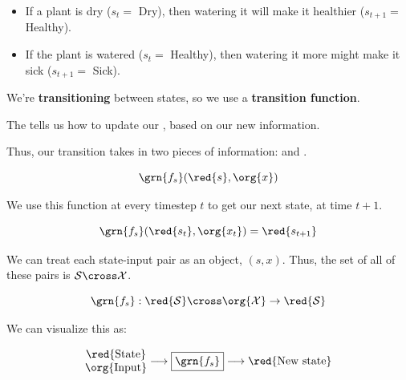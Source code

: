             \begin{itemize}
                \item If a plant is dry ($s_t=$ Dry), then watering it will make it healthier ($s_{t+1}=$ Healthy).
                \item If the plant is watered ($s_t=$ Healthy), then watering it more might make it sick ($s_{t+1}=$ Sick).
            \end{itemize}
            
            We're \textbf{transitioning} between states, so we use a \textbf{transition function}.\\
            
            \begin{definition}
                The   tells us how to update our , based on our new  information.
                
                Thus, our transition takes in two pieces of information:  and .
                
                \begin{equation*}
                    \grn{f_s}(\red{s},\org{x})
                \end{equation*}
                
                We use this function at every timestep $t$ to get our next state, at time $t+1$.
                
                \begin{equation*}
                    \grn{f_s}(\red{s_t},\org{x_t}) = \red{s_{t+1}}
                \end{equation*}
                
                We can treat each state-input pair as an object, $(s,x)$. Thus, the set of all of these pairs is $\mathcal{S} \cross \mathcal{X}$.
                
                \begin{equation*}
                    \grn{f_s}: \red{\mathcal{S}} \cross \org{\mathcal{X}} 
                    \rightarrow \red{\mathcal{S}}
                \end{equation*}
            \end{definition}
            
            We can visualize this as:
            
            \begin{equation}
                \begin{matrix}
                    \text{\red{State}} \\
                    \text{\org{Input}}
                \end{matrix}
                \longrightarrow
                \boxed{\grn{f_s}}
                \longrightarrow
                \text{\red{New state}}
            \end{equation}
                

